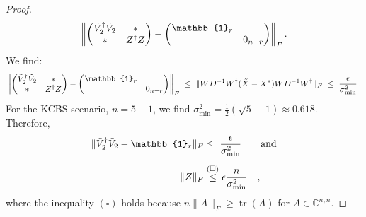 \begin{proof}
\begin{equation*}
\left\|
\begin{pmatrix}
\Tilde{V}_2^{\dag}\Tilde{V}_2 & * \\
* & Z^{\dag}Z
\end{pmatrix}
-
\begin{pmatrix}
\mathbb{1}_r & \\
& 0_{n-r}
\end{pmatrix}
\right\|_F.
\end{equation*}
We find:
\begin{equation*}
\left\|
\begin{pmatrix}
\Tilde{V}_2^{\dag}\Tilde{V}_2 & * \\
* & Z^{\dag}Z
\end{pmatrix}
-
\begin{pmatrix}
\mathbb{1}_r & \\
& 0_{n-r}
\end{pmatrix}
\right\|_F\;\leq\;\|WD^{-1}W^{\dag}(\Tilde{X}-X^*)WD^{-1}W^{\dag}\|_F\; \leq\; \frac{\epsilon}{\sigma_{\text{min}}^2}\thinspace.
\end{equation*}
For the KCBS scenario, $n=5+1$, we find $\sigma^2_{\text{min}}=\frac{1}{2}(\sqrt{5}-1)\approx 0.618$.
Therefore,
\begin{alignat*}{2}
\|\Tilde{V}_2^{\dag}\Tilde{V}_2-\mathbb{1}_r\|_F & \leq\;\frac{\epsilon}{\sigma_{\text{min}}^2} && \text{ and}\\[0.5em]
\|Z\|_F & \stackrel{(\square)}{\leq} \epsilon\frac{n}{\sigma_{\text{min}}^2}&&,
\end{alignat*}
where the inequality $(\square)$ holds because $n\|A\|_F\geq\operatorname{tr}(A)$ for $A\in\mathbb{C}^{n,n}$. 



\end{proof}
